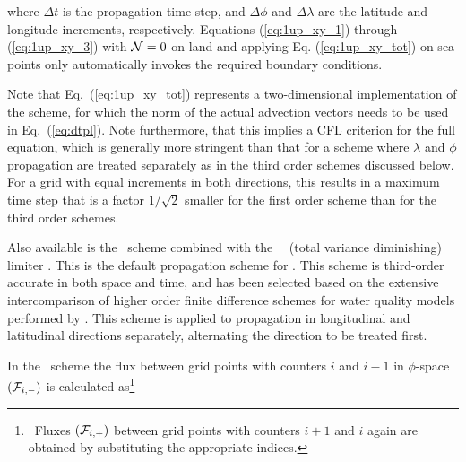 \noindent
where $\Delta t$ is the propagation time step, and $\Delta \phi$ and $\Delta
\lambda$ are the latitude and longitude increments, respectively. Equations
(\ref{eq:1up_xy_1}) through (\ref{eq:1up_xy_3}) with ${\cal N}=0$ on land and
applying Eq. (\ref{eq:1up_xy_tot}) on sea points only automatically invokes
the required boundary conditions.

Note that Eq.~(\ref{eq:1up_xy_tot}) represents a two-dimensional
implementation of the scheme, for which the norm of the actual advection
vectors needs to be used in Eq.~(\ref{eq:dtpl}). Note furthermore, that this
implies a CFL criterion for the full equation, which is generally more
stringent than that for a scheme where $\lambda$ and $\phi$ propagation are
treated separately as in the third order schemes discussed below. For a grid
with equal increments in both directions, this results in a maximum time step
that is a factor $1/\sqrt{2}$ smaller for the first order scheme than for the
third order schemes.

\vspace{\baselineskip} \noindent
Also available is the \qck\ scheme \citep{art:Leo79,art:DM82} combined with
the \ult\ \tvd\ (total variance diminishing) limiter \citep{art:Leo91}. This
is the default propagation scheme for \ws. This scheme is third-order accurate
in both space and time, and has been selected based on the extensive
intercomparison of higher order finite difference schemes for water quality
models performed by \citep[see][]{PhD:Cah,pro:FC93,tol:OMB95}. This scheme is
applied to propagation in longitudinal and latitudinal directions separately,
alternating the direction to be treated first.

In the \qck\ scheme the flux between grid points with counters $i$ and $i-1$
in $\phi$-space $({\cal F}_{i,-})$ is calculated as\footnote{~Fluxes $({\cal F}_{i,+})$
between grid points with counters $i+1$ and $i$ again are obtained by
substituting the appropriate indices.}


